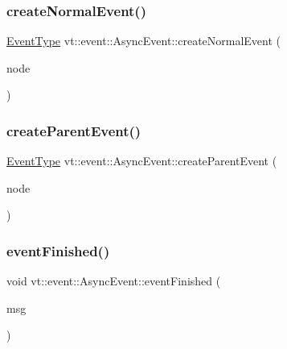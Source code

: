 \mbox{\label{structvt_1_1event_1_1_async_event_aa7c07c129ba54bde5abbe95c543ca352}} 
\subsubsection{\texorpdfstring{create\+Normal\+Event()}{createNormalEvent()}}
{\footnotesize\ttfamily \hyperlink{namespacevt_a009267401def7ae8bf201892222d060f}{Event\+Type} vt\+::event\+::\+Async\+Event\+::create\+Normal\+Event (\begin{DoxyParamCaption}\item[{\hyperlink{namespacevt_a866da9d0efc19c0a1ce79e9e492f47e2}{Node\+Type} const \&}]{node }\end{DoxyParamCaption})}

\mbox{\label{structvt_1_1event_1_1_async_event_a9646f211d660d2e991df07b77e5f2cc6}} 
\subsubsection{\texorpdfstring{create\+Parent\+Event()}{createParentEvent()}}
{\footnotesize\ttfamily \hyperlink{namespacevt_a009267401def7ae8bf201892222d060f}{Event\+Type} vt\+::event\+::\+Async\+Event\+::create\+Parent\+Event (\begin{DoxyParamCaption}\item[{\hyperlink{namespacevt_a866da9d0efc19c0a1ce79e9e492f47e2}{Node\+Type} const \&}]{node }\end{DoxyParamCaption})}

\mbox{\label{structvt_1_1event_1_1_async_event_a2228d79f1c1f838e630dcb3325edfde3}} 
\subsubsection{\texorpdfstring{event\+Finished()}{eventFinished()}}
{\footnotesize\ttfamily void vt\+::event\+::\+Async\+Event\+::event\+Finished (\begin{DoxyParamCaption}\item[{\hyperlink{structvt_1_1_event_finished_msg}{Event\+Finished\+Msg} $\ast$}]{msg }\end{DoxyParamCaption})\hspace{0.3cm}{\ttfamily [static]}}

